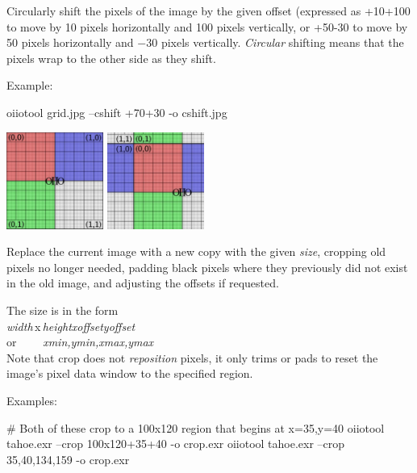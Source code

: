 Circularly shift the pixels of the image by the given offset (expressed
as {\cf +10+100} to move by 10 pixels horizontally and 100 pixels
vertically, or {\cf +50-30} to move by 50 pixels horizontally and
$-30$ pixels vertically.  \emph{Circular} shifting means that the
pixels wrap to the other side as they shift.

\noindent Example:
\begin{code}
    oiiotool grid.jpg --cshift +70+30 -o cshift.jpg
\end{code}
\spc \includegraphics[width=1.25in]{figures/grid-small.jpg} 
\raisebox{40pt}{\large $\rightarrow$}
\includegraphics[width=1.25in]{figures/cshift.jpg} \\
\apiend

Replace the current image with a new copy with the given \emph{size},
cropping old pixels no longer needed, padding black pixels where they
previously did not exist in the old image, and adjusting the offsets
if requested.

The size is in the form 
\\ \spc\spc \emph{width}\,{\cf x}\,\emph{height}{\cf [+-]}\emph{xoffset}{\cf
  [+-]}\emph{yoffset}
\\ or~~~~ \spc \emph{xmin,ymin,xmax,ymax} \\


Note that {\cf crop} does not \emph{reposition} pixels, it only trims or
pads to reset the image's pixel data window to the specified region.

\noindent Examples:

\begin{code}
    # Both of these crop to a 100x120 region that begins at x=35,y=40
    oiiotool tahoe.exr --crop 100x120+35+40 -o crop.exr
    oiiotool tahoe.exr --crop 35,40,134,159 -o crop.exr
\end{code}

